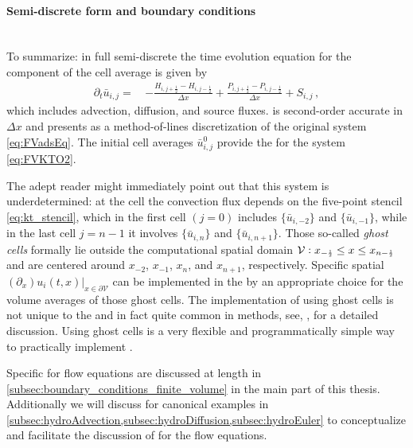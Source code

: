 \paragraph{Semi-discrete form and boundary conditions}\label{paragraph:KTBC}\mbox{} \\
To summarize: in full semi-discrete \ktScheme{} the time evolution equation for the  component of the  cell average is given by
\begin{align}
	\partial_t \bar{u}_{i,j} = \, & - \frac{H_{i,j + \frac{1}{2}} - H_{i,j - \frac{1}{2}}}{\Delta x} + \frac{P_{i,j + \frac{1}{2}} - P_{i,j - \frac{1}{2}}}{\Delta x} 
	+ S_{i,j}\, , \label{eq:FVKTO2}
\end{align}
which includes advection, diffusion, and source fluxes.
 is second-order accurate in $\Delta x$ and presents as a \fv{} method-of-lines discretization of the original \pde{} system \eqref{eq:FVadsEq}.
The initial cell averages $\bar{u}_{i,j}^0$ provide the \ic{} for the \ode{} system \eqref{eq:FVKTO2}.

The adept reader might immediately point out that this system is underdetermined: at the  cell the convection flux depends on the five-point stencil \eqref{eq:kt_stencil}, which in the first cell \nolinebreak[2]${(j=0)}$ includes $\{\bar{u}_{i,- 2}\}$ and $\{\bar{u}_{i,-1}\}$, while in the last cell $j=n-1$ it involves $\{\bar{u}_{i,n}\}$ and $\{\bar{u}_{i,n+1}\}$.
Those so-called \textit{ghost cells} formally lie outside the computational spatial domain $\mathcal{V}: x_{-\ttfrac{1}{2}}\le x\le x_{n-\ttfrac{1}{2}}$ and are centered around $x_{-2}$, $x_{-1}$, $x_{n}$, and $x_{n+1}$, respectively.
Specific spatial \bcs{} $( \partial_x ) u_i ( t, x ) |_{x \in \partial \mathcal{V}}$ can be implemented in the \ktScheme{} by an appropriate choice for the volume averages of those ghost cells. 
The implementation of \bcs{} using ghost cells is not unique to the \ktScheme{} and in fact quite common in \fv{} methods, see, \eg{},  for a detailed discussion.
Using ghost cells is a very flexible and programmatically simple way to practically implement \bcs{}.

Specific \bcs{} for \frg{} flow equations are discussed at length in \cref{subsec:boundary_conditions_finite_volume} in the main part of this thesis.
Additionally we will discuss \bcs{} for canonical examples in \cref{subsec:hydroAdvection,subsec:hydroDiffusion,subsec:hydroEuler} to conceptualize and facilitate the discussion of \bcs{} for the \frg{} flow equations.

